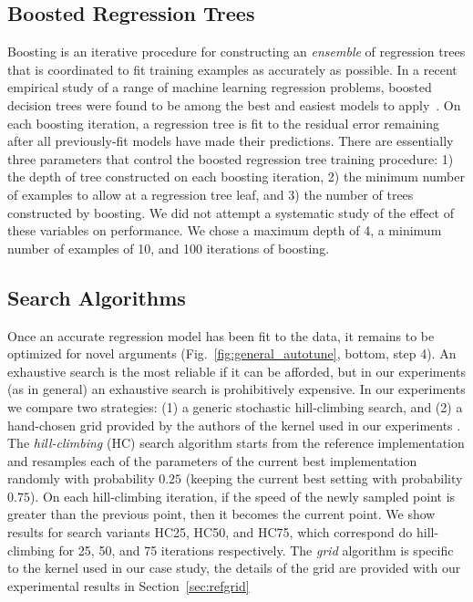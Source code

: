 \documentclass{sig-alternate}
\begin{document}
\subsection{Boosted Regression Trees}

Boosting is an iterative procedure for constructing an {\em ensemble} of regression trees that is coordinated to fit training examples as accurately as possible.
\citep{schapire:2001,friedman:2002}
In a recent empirical study of a range of machine learning regression problems,
boosted decision trees were found to be among the best and easiest models to
apply~\citep{caruana+niculescu-mizil:2006}.
On each boosting iteration, a regression tree is fit to the residual error remaining
after all previously-fit models have made their predictions.
There are essentially three parameters that control the boosted regression tree
training procedure:
1) the depth of tree constructed on each boosting iteration,
2) the minimum number of examples to allow at a regression tree leaf, and
3) the number of trees constructed by boosting.
We did not attempt a systematic study of the effect of these variables on performance.
We chose a maximum depth of 4,
a minimum number of examples of 10,
and 100 iterations of boosting.

\subsection{Search Algorithms}

Once an accurate regression model has been fit to the data, it remains to be optimized for novel arguments (Fig.~\ref{fig:general_autotune}, bottom, step 4).
An exhaustive search is the most reliable if it can be afforded, but in our experiments
(as in general) an exhaustive search is prohibitively expensive.
In our experiments we compare two strategies:
(1)
a generic stochastic hill-climbing search,
and (2)
a hand-chosen grid provided by the authors of the kernel used in our experiments \citep{pinto+cox:2011gcg}.
The {\em hill-climbing} (HC) search algorithm starts from the reference
implementation and resamples each of the parameters
of the current best implementation randomly with
probability $0.25$ (keeping the current best setting with probability $0.75$).
On each hill-climbing iteration, if the speed of the newly sampled point is greater than the previous point, then it becomes the current point.
We show results for search variants HC25, HC50, and HC75, which correspond do hill-climbing for 25, 50, and 75 iterations respectively.
The {\em grid} algorithm is specific to the kernel used in our case study,
the details of the grid are provided with our experimental results in Section~\ref{sec:refgrid}
\end{document}
